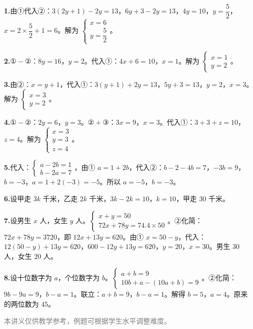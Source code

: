 \documentclass[12pt, a4paper]{ctexart}
\begin{document}
\begin{knowledgebox}[参考答案]

\textbf{1.}\quad 由①代入②：$3(2y+1) - 2y = 13$，$6y + 3 - 2y = 13$，$4y = 10$，$y = \dfrac{5}{2}$，$x = 2 \times \dfrac{5}{2} + 1 = 6$。解为 $\begin{cases} x = 6 \\ y = \dfrac{5}{2} \end{cases}$。

\medskip
\textbf{2.}\quad $① - ②$：$8y = 16$，$y = 2$。代入①：$4x + 6 = 10$，$x = 1$。解为 $\begin{cases} x = 1 \\ y = 2 \end{cases}$。

\medskip
\textbf{3.}\quad 由②：$x = y + 1$，代入①：$3(y+1) + 2y = 13$，$5y + 3 = 13$，$y = 2$，$x = 3$。解为 $\begin{cases} x = 3 \\ y = 2 \end{cases}$。

\medskip
\textbf{4.}\quad $① - ②$：$2y = 6$，$y = 3$。$② + ③$：$3x = 9$，$x = 3$。代入①：$3 + 3 + z = 10$，$z = 4$。解为 $\begin{cases} x = 3 \\ y = 3 \\ z = 4 \end{cases}$。

\medskip
\textbf{5.}\quad 代入：$\begin{cases} a - 2b = 1 \\ b - 2a = 7 \end{cases}$，由① $a = 1 + 2b$，代入②：$b - 2 - 4b = 7$，$-3b = 9$，$b = -3$，$a = 1 + 2(-3) = -5$。所以 $a = -5$，$b = -3$。

\medskip
\textbf{6.}\quad 设甲走 $3k$ 千米，乙走 $2k$ 千米，$3k - 2k = 10$，$k = 10$，甲走 $30$ 千米。

\medskip
\textbf{7.}\quad 设男生 $x$ 人，女生 $y$ 人。$\begin{cases} x + y = 50 \\ 72x + 78y = 74.4 \times 50 \end{cases}$。②化简：$72x + 78y = 3720$，即 $12x + 13y = 620$。由① $x = 50 - y$，代入：$12(50-y) + 13y = 620$，$600 - 12y + 13y = 620$，$y = 20$，$x = 30$。男生 $30$ 人，女生 $20$ 人。

\medskip
\textbf{8.}\quad 设十位数字为 $a$，个位数字为 $b$。$\begin{cases} a + b = 9 \\ 10b + a - (10a + b) = 9 \end{cases}$。②化简：$9b - 9a = 9$，$b - a = 1$。联立：$a + b = 9$，$b - a = 1$。解得 $b = 5$，$a = 4$。原来的两位数为 $45$。
\end{knowledgebox}

\vfill
\begin{center}
\small\textcolor{gray}{本讲义仅供教学参考，例题可根据学生水平调整难度。}
\end{center}
\end{document}
